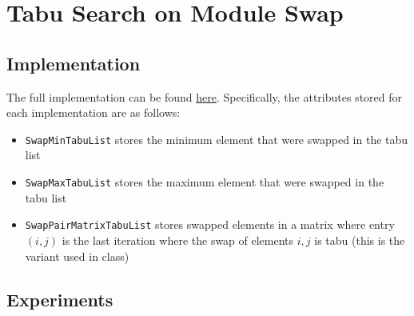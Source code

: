\section{Tabu Search on Module Swap}

\subsection{Implementation}

The full implementation can be found \href{https://github.com/nngerncham/ma395_heuristic/blob/main/homework/hw3/codebase/Notebooks/Problem\%203.ipynb}{here}. Specifically, the attributes stored for each implementation are as follows:
\begin{itemize}
    \item \texttt{SwapMinTabuList} stores the minimum element that were swapped in the tabu list
    \item \texttt{SwapMaxTabuList} stores the maximum element that were swapped in the tabu list
    \item \texttt{SwapPairMatrixTabuList} stores swapped elements in a matrix where entry \((i, j)\) is the last iteration where the swap of elements \(i, j\) is tabu (this is the variant used in class)
\end{itemize}

\subsection{Experiments}

